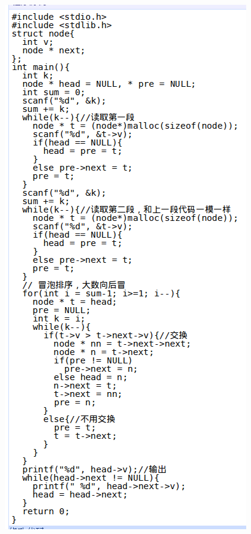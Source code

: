 \documentclass[color=usenames,dvipsnames]{beamer}
\begin{document}
{{\begin{columns}
     \column{0.7\hsize}
     \includegraphics[width=0.45\hsize]{pic/链表合并排序-good.png}
     \end{columns}
     }
} 
\end{document}
